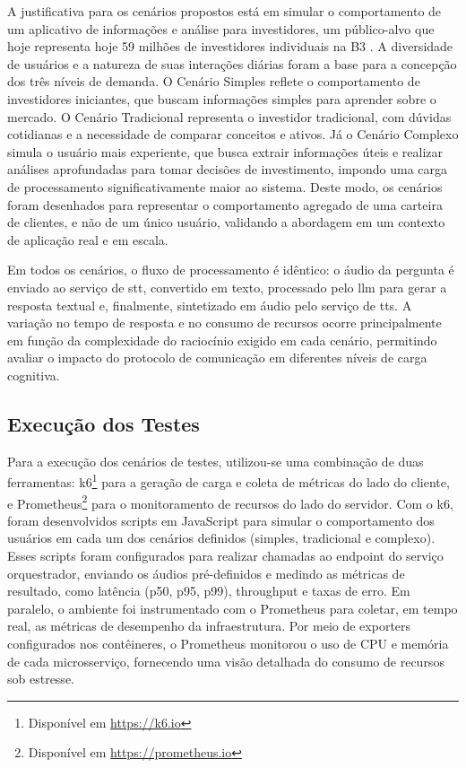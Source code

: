 A justificativa para os cenários propostos está em simular o comportamento de um aplicativo de informações e análise para investidores, um público-alvo que hoje representa hoje 59 milhões de investidores individuais na B3 \cite{anbima_raio_nodate}. A diversidade de usuários e a natureza de suas interações diárias foram a base para a concepção dos três níveis de demanda. O Cenário Simples reflete o comportamento de investidores iniciantes, que buscam informações simples para aprender sobre o mercado. O Cenário Tradicional representa o investidor tradicional, com dúvidas cotidianas e a necessidade de comparar conceitos e ativos. Já o Cenário Complexo simula o usuário mais experiente, que busca extrair informações úteis e realizar análises aprofundadas para tomar decisões de investimento, impondo uma carga de processamento significativamente maior ao sistema. Deste modo, os cenários foram desenhados para representar o comportamento agregado de uma carteira de clientes, e não de um único usuário, validando a abordagem em um contexto de aplicação real e em escala.

Em todos os cenários, o fluxo de processamento é idêntico: o áudio da pergunta é enviado ao serviço de \gls{stt}, convertido em texto, processado pelo \gls{llm} para gerar a resposta textual e, finalmente, sintetizado em áudio pelo serviço de \gls{tts}. A variação no tempo de resposta e no consumo de recursos ocorre principalmente em função da complexidade do raciocínio exigido em cada cenário, permitindo avaliar o impacto do protocolo de comunicação em diferentes níveis de carga cognitiva.

\subsection{Execução dos Testes}

Para a execução dos cenários de testes, utilizou-se uma combinação de duas ferramentas: k6\footnote{Disponível em \url{https://k6.io}} para a geração de carga e coleta de métricas do lado do cliente, e Prometheus\footnote{Disponível em \url{https://prometheus.io}} para o monitoramento de recursos do lado do servidor. Com o k6, foram desenvolvidos scripts em JavaScript para simular o comportamento dos usuários em cada um dos cenários definidos (simples, tradicional e complexo). Esses scripts foram configurados para realizar chamadas ao endpoint do serviço orquestrador, enviando os áudios pré-definidos e medindo as métricas de resultado, como latência (p50, p95, p99), throughput e taxas de erro. Em paralelo, o ambiente foi instrumentado com o Prometheus para coletar, em tempo real, as métricas de desempenho da infraestrutura. Por meio de exporters configurados nos contêineres, o Prometheus monitorou o uso de CPU e memória de cada microsserviço, fornecendo uma visão detalhada do consumo de recursos sob estresse.

